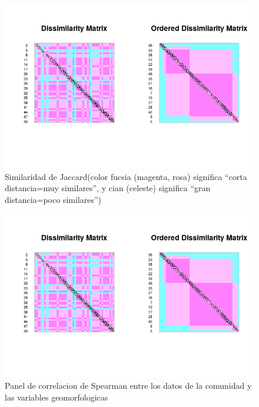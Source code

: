 \documentclass[11pt,]{article}
\begin{document}
\begin{figure}
\centering
\includegraphics{medicion_asociacion_jaccard.png}
\caption{Similaridad de Jaccard(color fucsia (magenta, rosa) significa
``corta distancia=muy similares'', y cian (celeste) significa ``gran
distancia=poco similares'')\label{fig:similaridad_jaccard}}
\end{figure}

\begin{figure}
\centering
\includegraphics{medicion_asociacion_jaccard.png}
\caption{Panel de correlacion de Spearman entre los datos de la
comunidad y las variables
geomorfologicas\label{fig:matriz_correlacion_geomorf_abun_riq_spearman}}
\end{figure}
\end{document}
